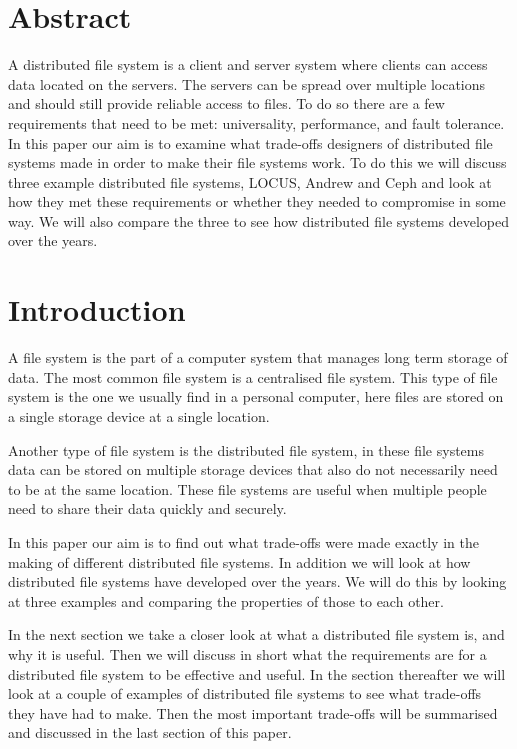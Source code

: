 \documentclass[a4paper,12px]{article}
\begin{document}
\clearpage
\vspace*{0.5cm}
\tableofcontents
\clearpage




\section{Abstract}

A distributed file system is a client and server system where clients can access
data located on the servers. The servers can be spread over multiple locations
and should still provide reliable access to files. To do so there are a few
requirements that need to be met: universality, performance, and fault
tolerance.  In this paper our aim is to examine what trade-offs designers of
distributed file systems made in order to make their file systems work. To do
this we will discuss three example distributed file systems, LOCUS, Andrew and
Ceph and look at how they met these requirements or whether they needed to
compromise in some way. We will also compare the three to see how distributed
file systems developed over the years.

\section{Introduction}

A file system is the part of a computer system that manages long term storage of
data. The most common file system is a centralised file system. This type of
file system is the one we usually find in a personal computer, here files are
stored on a single storage device at a single location.

Another type of file system is the distributed file system, in these file
systems data can be stored on multiple storage devices that also do not
necessarily need to be at the same location. These file systems are useful when
multiple people need to share their data quickly and securely.

In this paper our aim is to find out what trade-offs were made exactly in the
making of different distributed file systems. In addition we will look at how
distributed file systems have developed over the years. We will do this by
looking at three examples and comparing the properties of those to each other.

In the next section we take a closer look at what a distributed file system is,
and why it is useful. Then we will discuss in short what the requirements are
for a distributed file system to be effective and useful. In the section
thereafter we will look at a couple of examples of distributed file systems to
see what trade-offs they have had to make. Then the most important trade-offs
will be summarised and discussed in the last section of this paper.
\end{document}
